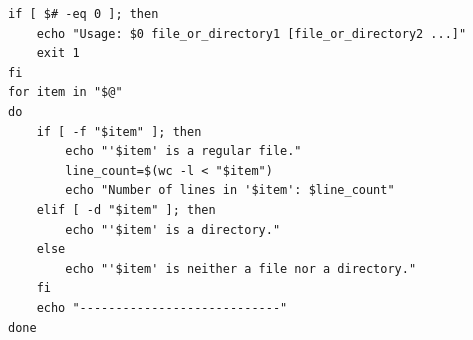 \begin{verbatim}
if [ $# -eq 0 ]; then
    echo "Usage: $0 file_or_directory1 [file_or_directory2 ...]"
    exit 1
fi
for item in "$@"
do
    if [ -f "$item" ]; then
        echo "'$item' is a regular file."
        line_count=$(wc -l < "$item")
        echo "Number of lines in '$item': $line_count"
    elif [ -d "$item" ]; then
        echo "'$item' is a directory."
    else
        echo "'$item' is neither a file nor a directory."
    fi
    echo "----------------------------"
done
\end{verbatim}
